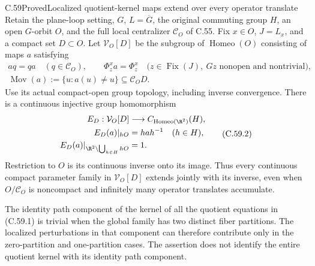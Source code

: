 \begin{claim}{C.59}{Proved}{Localized quotient-kernel maps extend over every operator translate}
Retain the plane-loop setting, $G$, $L=\overline G$,
the original commuting group $H$, an open $G$-orbit $O$,
and the full local centralizer $\mathcal C_O$ of C.55.
Fix $x\in O$, $J=L_x$, and a compact set $D\subset O$.
Let $\mathcal V_O[D]$ be the subgroup of
$\operatorname{Homeo}(O)$ consisting of maps $a$ satisfying
\[
 \begin{gathered}
 aq=qa\quad(q\in\mathcal C_O),\qquad
 \Phi_z^x a=\Phi_z^x
 \quad\bigl(z\in\operatorname{Fix}(J),\
                   Gz\text{ nonopen and nontrivial}\bigr),\\
 \operatorname{Mov}(a):=\{u:a(u)\ne u\}
                                  \subseteq\mathcal C_O D .
 \end{gathered}                                           \tag{C.59.1}
\]
Use its actual compact-open group topology, including
inverse convergence. There is a continuous injective
group homomorphism
\[
 \begin{split}
 E_D:\mathcal V_O[D]&\longrightarrow
                C_{\operatorname{Homeo}(\R^2)}(H),\\
 E_D(a)|_{hO}&=h a h^{-1}\quad(h\in H),\\
 E_D(a)|_{\R^2\setminus\bigcup_{h\in H}hO}&=1 .
 \end{split}                                             \tag{C.59.2}
\]
Restriction to $O$ is its continuous inverse onto its
image. Thus every continuous compact parameter family
in $\mathcal V_O[D]$ extends jointly with its inverse,
even when $O/\mathcal C_O$ is noncompact and infinitely
many operator translates accumulate.

The identity path component of the kernel of all the
quotient equations in (C.59.1) is trivial when the
global family has two distinct fiber partitions.
The localized perturbations in that component can
therefore contribute only in the zero-partition and
one-partition cases. The assertion does not identify
the entire quotient kernel with its identity path component.
\end{claim}

